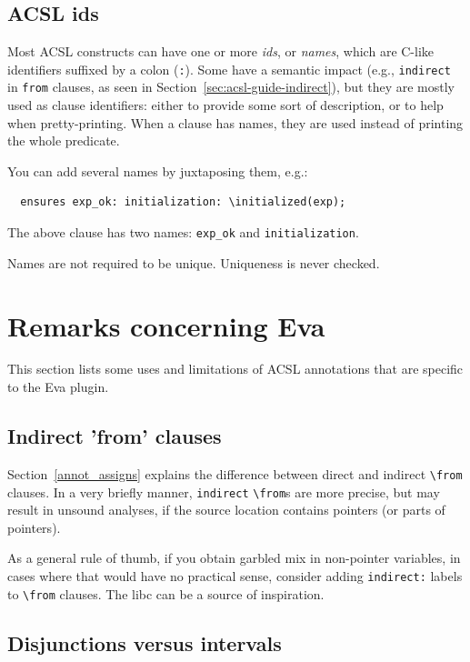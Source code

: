 \documentclass[web]{frama-c-book}
\newcommand{\Eva}{\textsf{Eva}}
\begin{document}
\subsection*{ACSL ids}

Most ACSL constructs can have one or more {\em ids}, or {\em names}, which are
C-like identifiers suffixed by a colon (\texttt{:}).
Some have a semantic impact (e.g., \texttt{indirect} in \texttt{from} clauses,
as seen in Section~\ref{sec:acsl-guide-indirect}),
but they are mostly used as clause identifiers: either to
provide some sort of description, or to help when pretty-printing.
When a clause has names, they are used instead of printing the whole predicate.

You can add several names by juxtaposing them, e.g.:

\begin{lstlisting}
  ensures exp_ok: initialization: \initialized(exp);
\end{lstlisting}

The above clause has two names: \verb+exp_ok+ and \verb+initialization+.

Names are not required to be unique. Uniqueness is never checked.

\section{Remarks concerning Eva}

This section lists some uses and limitations of ACSL annotations that are
specific to the \Eva{} plugin.

\subsection*{Indirect 'from' clauses}
\label{sec:acsl-guide-indirect}

Section~\ref{annot_assigns} explains the difference between direct
and indirect \verb+\from+ clauses. In a very briefly manner,
\texttt{indirect} \verb+\from+s are more precise, but may result
in unsound analyses, if the source location contains pointers
(or parts of pointers).

As a general rule of thumb, if you obtain garbled mix in non-pointer
variables, in cases where that would have no practical sense, consider
adding \texttt{indirect:} labels to \verb+\from+ clauses. The \FramaC
libc can be a source of inspiration.

\subsection*{Disjunctions versus intervals}
\end{document}
